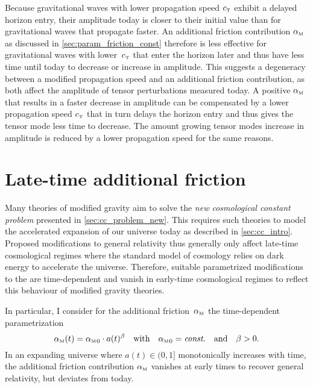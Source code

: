 \documentclass[12pt,parskip=half]{scrreprt}
\begin{document}
Because gravitational waves with lower propagation speed \({c_{\textnormal{\tiny{T}}}}\) exhibit a delayed horizon entry, their amplitude today is closer to their initial value than for gravitational waves that propagate faster. An additional friction contribution \({\alpha_{\textnormal{\tiny{M}}}}\) as discussed in \autoref{sec:param_friction_const} therefore is less effective for gravitational waves with lower~\({c_{\textnormal{\tiny{T}}}}\) that enter the horizon later and thus have less time until today to decrease or increase in amplitude. This suggests a degeneracy between a modified propagation speed and an additional friction contribution, as both affect the amplitude of tensor perturbations measured today. A positive \({\alpha_{\textnormal{\tiny{M}}}}\) that results in a faster decrease in amplitude can be compensated by a lower propagation speed \({c_{\textnormal{\tiny{T}}}}\) that in turn delays the horizon entry and thus gives the tensor mode less time to decrease. The amount growing tensor modes increase in amplitude is reduced by a lower propagation speed for the same reasons.



\section{Late-time additional friction}\label{sec:param_friction_late}

Many theories of modified gravity aim to solve the \emph{new cosmological constant problem} presented in \autoref{sec:cc_problem_new}. This requires such theories to model the accelerated expansion of our universe today as described in \autoref{sec:cc_intro}. Proposed modifications to general relativity thus generally only affect late-time cosmological regimes  where the \LCDM standard model of cosmology relies on dark energy to accelerate the universe. Therefore, suitable parametrized modifications to the  are time-dependent and vanish in early-time cosmological regimes to reflect this behaviour of modified gravity theories.

In particular, I consider for the additional friction~\({\alpha_{\textnormal{\tiny{M}}}}\) the time-dependent pa\-ra\-me\-tri\-za\-tion
\begin{equation}\label{eq:friction_param_powerlaw}
	{\alpha_{\textnormal{\tiny{M}}}}(t) = {\alpha_{\textnormal{\tiny{M}}}}_0 \cdot a(t)^\beta \quad \text{with} \quad {\alpha_{\textnormal{\tiny{M}}}}_0 = \textnormal{\textit{const.}} \quad \text{and} \quad \beta > 0
	\mathpunct{.}
\end{equation}
In an expanding universe where \(a(t) \in (0,1]\) monotonically increases with time, the additional friction contribution \({\alpha_{\textnormal{\tiny{M}}}}\) vanishes at early times to recover general relativity, but deviates from \LCDM today.
\end{document}
